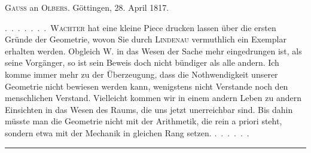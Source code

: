 \clearpage
\begin{center}\textsc{Gauss} an \textsc{Olbers}. Göttingen, 28. April 1817.\end{center}

.\ .\ .\ .\ .\ .\ .\ \textsc{Wachter} hat eine kleine Piece drucken lassen über die
ersten Gründe der Geometrie, wovon Sie durch \textsc{Lindenau} vermuthlich
ein Exemplar erhalten werden. Obgleich W. in das Wesen der Sache mehr
eingedrungen ist, als seine Vorgänger, so ist sein Beweis doch nicht
bündiger als alle andern. Ich komme immer mehr zu der Überzeugung, dass die
Nothwendigkeit unserer Geometrie nicht bewiesen werden kann, wenigstens
nicht  \textbf{} Verstande noch  den menschlichen Verstand.
Vielleicht kommen wir in einem andern Leben zu andern Einsichten in das
Wesen des Raums, die uns jetzt unerreichbar sind. Bis dahin müsste man die
Geometrie nicht mit der Arithmetik, die rein a priori steht, sondern etwa
mit der Mechanik in gleichen Rang setzen. .\ .\ .\ .\ .\ .

\begin{center}\rule{3cm}{0.4pt}\end{center}

